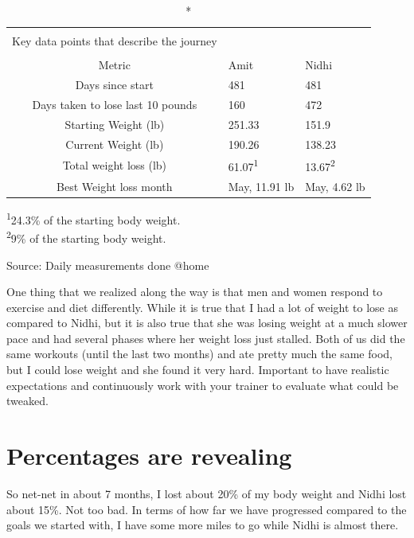 \documentclass[
  oneside]{book}
\begin{document}
\captionsetup[table]{labelformat=empty,skip=1pt}
\begin{longtable}{cll}
\caption*{
\large \textbf{Important Metrics}\\ 
\small Key data points that describe the journey\\ 
} \\ 
\toprule
Metric & Amit & Nidhi \\ 
\midrule
Days since start & 481 & 481 \\ 
Days taken to lose last 10 pounds & 160 & 472 \\ 
Starting Weight (lb) & 251.33 & 151.9 \\ 
Current Weight (lb) & 190.26 & 138.23 \\ 
Total weight loss (lb) & 61.07\textsuperscript{1} & 13.67\textsuperscript{2} \\ 
Best Weight loss month & May, 11.91 lb & May, 4.62 lb \\ 
\bottomrule
\end{longtable}
\vspace{-5mm}
\begin{minipage}{\linewidth}
\textsuperscript{1}24.3\% of the starting body weight. \\ 
\textsuperscript{2}9\% of the starting body weight. \\ 
\end{minipage}
\begin{minipage}{\linewidth}
Source: Daily measurements done @home\\ 
\end{minipage}

One thing that we realized along the way is that men and women respond to exercise and diet differently. While it is true that I had a lot of weight to lose as compared to Nidhi, but it is also true that she was losing weight at a much slower pace and had several phases where her weight loss just stalled. Both of us did the same workouts (until the last two months) and ate pretty much the same food, but I could lose weight and she found it very hard. Important to have realistic expectations and continuously work with your trainer to evaluate what could be tweaked.

\hypertarget{percentages-are-revealing}{%
\section{Percentages are revealing}\label{percentages-are-revealing}}

So net-net in about 7 months, I lost about 20\% of my body weight and Nidhi lost about 15\%. Not too bad. In terms of how far we have progressed compared to the goals we started with, I have some more miles to go while Nidhi is almost there.
\end{document}
